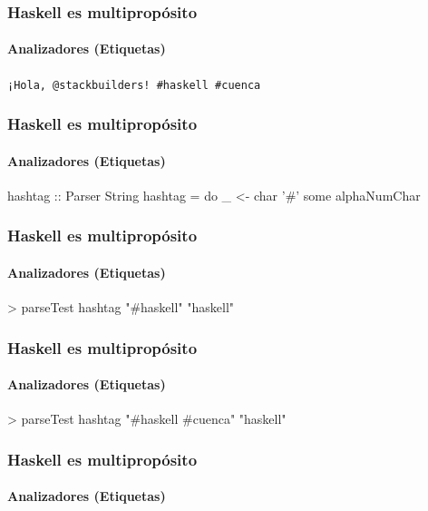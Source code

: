 \documentclass[spanish]{beamer}
\begin{document}

\begin{frame}
  \frametitle{Haskell es multipropósito}
  \framesubtitle{Analizadores (Etiquetas)}

  \texttt{¡Hola, @stackbuilders! \#\alert<2>{haskell} \#\alert<2>{cuenca}}
\end{frame}



\begin{frame}[fragile]
  \frametitle{Haskell es multipropósito}
  \framesubtitle{Analizadores (Etiquetas)}

  \begin{code}
hashtag :: Parser String
hashtag = do
  _ <- char '#'
  some alphaNumChar
  \end{code}
\end{frame}


\begin{frame}[fragile]
  \frametitle{Haskell es multipropósito}
  \framesubtitle{Analizadores (Etiquetas)}

  \begin{code}
> parseTest hashtag "#haskell"
"haskell"
  \end{code}
\end{frame}


\begin{frame}[fragile]
  \frametitle{Haskell es multipropósito}
  \framesubtitle{Analizadores (Etiquetas)}

  \begin{code}
> parseTest hashtag "#haskell #cuenca"
"haskell"
  \end{code}
\end{frame}


\begin{frame}[fragile]
  \frametitle{Haskell es multipropósito}
  \framesubtitle{Analizadores (Etiquetas)}

\end{frame}
\end{document}
